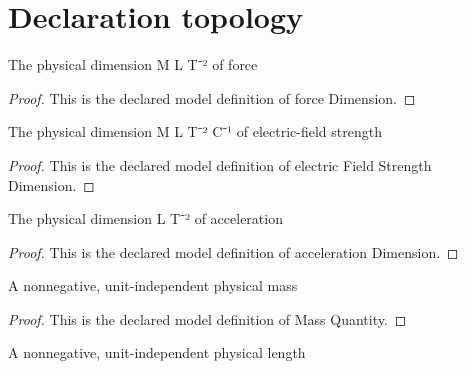\section{Declaration topology}
\begin{definition}
  \label{def:physics:phyx-mini-0906:phyxminiproblems-problemphyxmini0906-forcedimension}
  The physical dimension M L T⁻² of force
\end{definition}
\begin{proof}
  This is the declared model definition of force Dimension.
\end{proof}
\begin{definition}
  \label{def:physics:phyx-mini-0906:phyxminiproblems-problemphyxmini0906-electricfieldstrengthdimension}
  The physical dimension M L T⁻² C⁻¹ of electric-field strength
\end{definition}
\begin{proof}
  This is the declared model definition of electric Field Strength Dimension.
\end{proof}
\begin{definition}
  \label{def:physics:phyx-mini-0906:phyxminiproblems-problemphyxmini0906-accelerationdimension}
  The physical dimension L T⁻² of acceleration
\end{definition}
\begin{proof}
  This is the declared model definition of acceleration Dimension.
\end{proof}
\begin{definition}
  \label{def:physics:phyx-mini-0906:phyxminiproblems-problemphyxmini0906-massquantity}
  A nonnegative, unit-independent physical mass
\end{definition}
\begin{proof}
  This is the declared model definition of Mass Quantity.
\end{proof}
\begin{definition}
  \label{def:physics:phyx-mini-0906:phyxminiproblems-problemphyxmini0906-lengthquantity}
  A nonnegative, unit-independent physical length
\end{definition}
